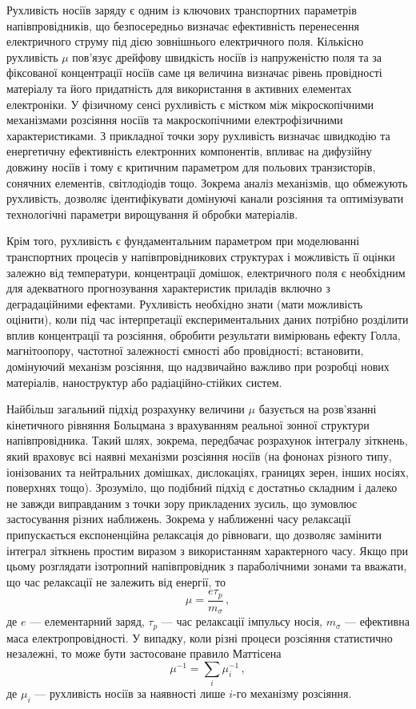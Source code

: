 \documentclass[fleqn,twoside,twocolumn,nofootinbib,showkeys]{revtex4} %
\begin{document}
Рухливість носіїв заряду є одним із ключових транспортних параметрів напівпровідників,
що безпосередньо визначає ефективність перенесення електричного струму під дією зовнішнього електричного поля.
Кількісно рухливість $\mu$ пов’язує дрейфову швидкість носіїв із напруженістю поля та
за фіксованої концентрації носіїв саме ця величина визначає рівень провідності матеріалу
та його придатність для використання в активних елементах електроніки.
У фізичному сенсі рухливість є містком між мікроскопічними механізмами розсіяння носіїв та макроскопічними електрофізичними характеристиками.
З прикладної точки зору рухливість визначає швидкодію та енергетичну ефективність електронних компонентів,
впливає на дифузійну довжину носіїв і тому є критичним параметром для польових транзисторів,  сонячних елементів, світлодіодів тощо.
Зокрема аналіз механізмів, що обмежують рухливість, дозволяє ідентифікувати домінуючі канали розсіяння та оптимізувати технологічні параметри вирощування й обробки матеріалів.

Крім того, рухливість є фундаментальним параметром при моделюванні транспортних процесів у напівпровідникових структурах і можливість її оцінки
залежно від температури, концентрації домішок, електричного поля є необхідним для адекватного прогнозування характеристик приладів включно з деградаційними ефектами.
Рухливість необхідно знати (мати можливість оцінити), коли під час інтерпретації експериментальних даних потрібно
розділити вплив концентрації та розсіяння, обробити результати вимірювань ефекту Голла, магнітоопору, частотної залежності ємності або провідності;
встановити, домінуючий механізм розсіяння, що надзвичайно важливо при розробці нових матеріалів, наноструктур або радіаційно-стійких систем.

Найбільш загальний підхід розрахунку величини $\mu$ базується на розв’язанні кінетичного рівняння Больцмана
з врахуванням реальної зонної структури напівпровідника.
Такий шлях, зокрема, передбачає розрахунок інтегралу зіткнень, який враховує всі наявні механізми розсіяння носіїв
(на фононах різного типу, іонізованих та нейтральних домішках, дислокаціях, границях зерен, інших носіях, поверхнях тощо).
Зрозуміло, що подібний підхід є достатньо складним і далеко не завжди виправданим з точки зору прикладених зусиль, що зумовлює застосування різних наближень.
Зокрема у наближенні часу релаксації припускається експоненційна релаксація до рівноваги, що дозволяє замінити інтеграл зіткнень простим виразом
з використанням характерного часу.
Якщо при цьому розглядати ізотропний напівпровідник з параболічними зонами та вважати, що час релаксації не залежить від енергії, то \cite{Hamaguchi2023}
\begin{equation}\label{eqG}
  \mu=\frac{e\tau_p}{m_\sigma}\,,
\end{equation}
де
$e$ --- елементарний заряд,
$\tau_p$ --- час релаксації імпульсу носія,
$m_\sigma$ --- ефективна маса електропровідності.
У випадку, коли різні процеси розсіяння статистично незалежні, то може бути застосоване правило Маттісена \cite{Leveillee2023}
\begin{equation}\label{eqM}
  \mu^{-1}=\sum_i \mu_i^{-1}\,,
\end{equation}
де
$\mu_i$ --- рухливість носіїв за наявності лише $i$-го механізму розсіяння.
\end{document}
